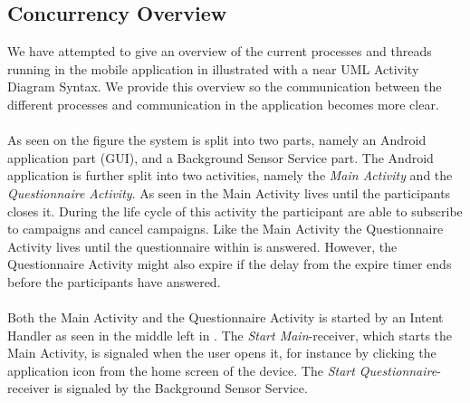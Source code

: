 \subsection{Concurrency Overview}
We have attempted to give an overview of the current processes and threads running in the mobile application in  illustrated with a near UML Activity Diagram Syntax. We provide this overview so the communication between the different processes and communication in the application becomes more clear.
\\\\
As seen on the figure the system is split into two parts, namely an Android application part (GUI), and a Background Sensor Service part. The Android application is further split into two activities, namely the \emph{Main Activity} and the \emph{Questionnaire Activity}. As seen in  the Main Activity lives until the participants closes it. During the life cycle of this activity the participant are able to subscribe to campaigns and cancel campaigns. Like the Main Activity the Questionnaire Activity lives until the questionnaire within is answered. However, the Questionnaire Activity might also expire if the delay from the expire timer ends before the participants have answered. 
\\\\
Both the Main Activity and the Questionnaire Activity is started by an Intent Handler as seen in the middle left in . The \emph{Start Main}-receiver, which starts the Main Activity, is signaled when the user opens it, for instance by clicking the application icon from the home screen of the device. The \emph{Start Questionnaire}-receiver is signaled by the Background Sensor Service.
\\\\
